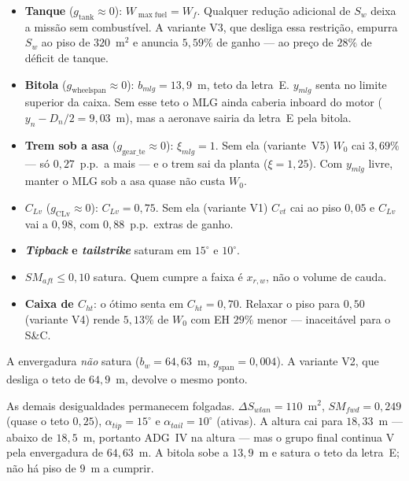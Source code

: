 \begin{itemize}
\item \textbf{Tanque} ($g_{\mathrm{tank}}\approx 0$): $W_{\max\mathrm{fuel}}=W_f$.
      Qualquer redução adicional de $S_w$ deixa a missão sem
      combustível. A variante V3, que desliga essa restrição, empurra
      $S_w$ ao piso de $320$~m$^2$ e anuncia $5{,}59\%$ de ganho --- ao
      preço de $28\%$ de déficit de tanque.
\item \textbf{Bitola} ($g_{\mathrm{wheelspan}}\approx 0$): $b_{mlg}=13{,}9$~m,
      teto da letra~E. $y_{mlg}$ senta no limite superior da caixa. Sem
      esse teto o MLG ainda caberia inboard do motor ($y_n-D_n/2=9{,}03$~m),
      mas a aeronave sairia da letra~E pela bitola.
\item \textbf{Trem sob a asa} ($g_{\mathrm{gear\_te}}\approx 0$):
      $\xi_{mlg}=1$. Sem ela (variante~V5) $W_0$ cai $3{,}69\%$ --- só
      $0{,}27$~p.p.\ a mais --- e o trem sai da planta ($\xi=1{,}25$).
      Com $y_{mlg}$ livre, manter o MLG sob a asa quase não custa $W_0$.
\item \textbf{$C_{Lv}$} ($g_{\mathrm{CLv}}\approx 0$): $C_{Lv}=0{,}75$. Sem
      ela (variante V1) $C_{vt}$ cai ao piso $0{,}05$ e $C_{Lv}$ vai a
      $0{,}98$, com $0{,}88$~p.p.\ extras de ganho.
\item \textbf{\emph{Tipback} e \emph{tailstrike}} saturam em $15^\circ$ e
      $10^\circ$.
\item \textbf{$SM_{aft}\le 0{,}10$} satura. Quem cumpre a faixa é
      $x_{r,w}$, não o volume de cauda.
\item \textbf{Caixa de $C_{ht}$}: o ótimo senta em $C_{ht}=0{,}70$.
      Relaxar o piso para $0{,}50$ (variante V4) rende $5{,}13\%$ de $W_0$
      com EH $29\%$ menor --- inaceitável para o S\&C.
\end{itemize}

A envergadura \emph{não} satura ($b_w=64{,}63$~m, $g_{\mathrm{span}}=0{,}004$).
A variante V2, que desliga o teto de $64{,}9$~m, devolve o mesmo ponto.

\begin{table}[H]
\centering
\caption{Estudo de remoção das restrições ativas. Cada variante
parte da mesma configuração de PRJ-22.}
\label{tab:var}
\small

\end{table}

As demais desigualdades permanecem folgadas.
$\Delta S_{wlan}=110$~m$^2$, $SM_{fwd}=0{,}249$ (quase o teto $0{,}25$),
$\alpha_{tip}=15^\circ$ e $\alpha_{tail}=10^\circ$ (ativas). A altura cai
para $18{,}33$~m --- abaixo de $18{,}5$~m, portanto ADG~IV na altura ---
mas o grupo final continua V pela envergadura de $64{,}63$~m. A bitola
sobe a $13{,}9$~m e satura o teto da letra~E; não há piso de $9$~m a
cumprir.


